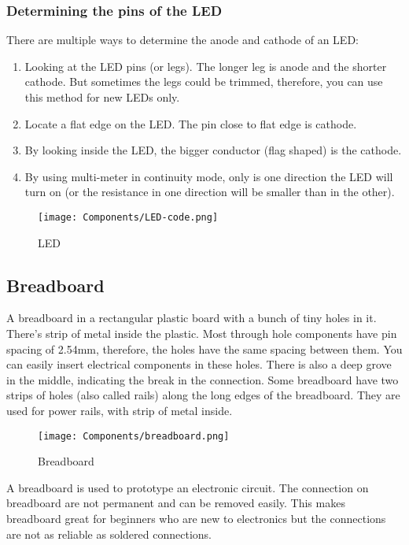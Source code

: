 \subsubsection{Determining the pins of the LED}
There are multiple ways to determine the anode and cathode of an LED:
\begin{enumerate}
    \item Looking at the LED pins (or legs). The longer leg is anode and the shorter cathode. But sometimes the legs could be trimmed, therefore, you can use this method for new LEDs only.
    \item Locate a flat edge on the LED. The pin close to flat edge is cathode.
    \item By looking inside the LED, the bigger conductor (flag shaped) is the cathode.
    \item By using multi-meter in continuity mode, only is one direction the LED will turn on (or the resistance in one direction will be smaller than in the other).
\end{enumerate}

\begin{figure}[!htp]
    \centering
    \texttt{[image: Components/LED-code.png]}
    \caption{LED}
    \label{fig:led_code}
\end{figure}

\subsection{Breadboard}
A breadboard in a rectangular plastic board with a bunch of tiny holes in it. There's strip of metal inside the plastic. Most through hole components have pin spacing of 2.54mm, therefore, the holes have the same spacing between them. You can easily insert electrical components in these holes. There is also a deep grove in the middle, indicating the break in the connection. Some breadboard have two strips of holes (also called rails) along the long edges of the breadboard. They are used for power rails, with strip of metal inside.
\begin{figure}[!htp]
    \centering
    \texttt{[image: Components/breadboard.png]}
    \caption{Breadboard}
    \label{fig:breadboard_code}
\end{figure}
A breadboard is used to prototype an electronic circuit. The connection on breadboard are not permanent and can be removed easily. This makes breadboard great for beginners who are new to electronics but the connections are not as reliable as soldered connections.

